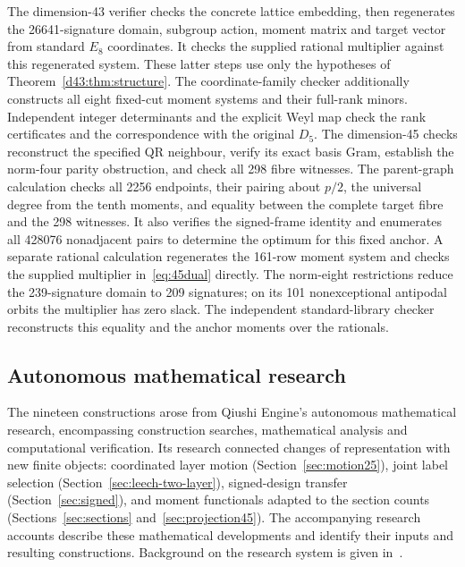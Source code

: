 The dimension-43 verifier checks the concrete lattice embedding, then
regenerates the 26641-signature domain, subgroup action, moment matrix
and target vector from standard $E_8$ coordinates. It checks the supplied
rational multiplier against this regenerated system. These latter steps
use only the hypotheses of Theorem~\ref{d43:thm:structure}.
The coordinate-family checker additionally constructs all eight
fixed-cut moment systems and their full-rank minors. Independent integer
determinants and the explicit Weyl map check the rank certificates and
the correspondence with the original $D_5$.
The dimension-45 checks reconstruct the
specified QR neighbour, verify its exact basis Gram, establish the
norm-four parity obstruction, and check all 298 fibre witnesses.
The parent-graph calculation checks all 2256 endpoints, their pairing
about $p/2$, the universal degree from the tenth moments, and equality
between the complete target fibre and the 298 witnesses.
It also verifies the signed-frame identity and enumerates all 428076
nonadjacent pairs to determine the optimum for this fixed anchor.
A separate rational calculation regenerates the 161-row moment system
and checks the supplied multiplier in~\eqref{eq:45dual} directly.
The norm-eight restrictions reduce the 239-signature domain to 209
signatures; on its 101 nonexceptional antipodal orbits the multiplier
has zero slack. The independent standard-library checker
 reconstructs this equality
and the anchor moments over the rationals.

\subsection{Autonomous mathematical research}\label{sec:autonomous-research}
The nineteen constructions arose from Qiushi Engine's autonomous
mathematical research, encompassing construction searches, mathematical
analysis and computational verification. Its research connected
changes of representation with new finite objects: coordinated layer
motion (Section~\ref{sec:motion25}), joint label selection
(Section~\ref{sec:leech-two-layer}), signed-design transfer
(Section~\ref{sec:signed}), and moment functionals adapted to the
section counts (Sections~\ref{sec:sections} and~\ref{sec:projection45}).
The accompanying research
accounts describe these mathematical developments and identify their
inputs and resulting constructions. Background on the research system
is given in~\cite{qiushi-optics}.
